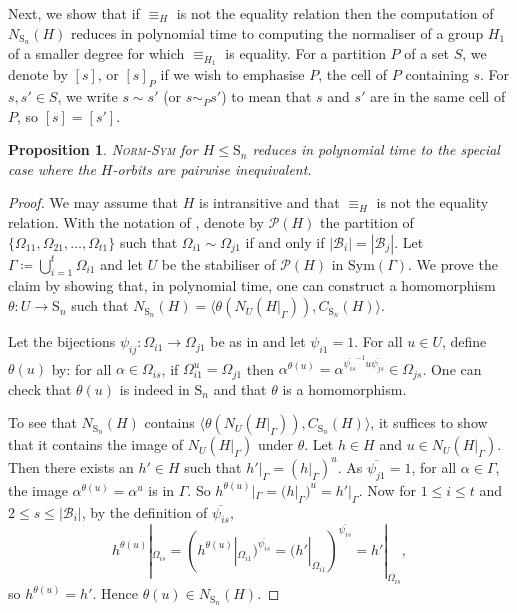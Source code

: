 \documentclass[11pt,a4paper]{article}
\newtheorem{proposition}[theorem]{Proposition}
\theoremstyle{definition}
\theoremstyle{remark}
\newcommand{\Sym}[0]{\mathrm{Sym}}
\newcommand{\Sy}{\mathrm{S}}
\begin{document}
Next, we show that if $\equiv_H$ is not the equality relation then the computation of $N_{\Sy_n}(H)$ reduces in polynomial time to computing the normaliser of a group $H_1$ of a smaller degree for which $\equiv_{H_1}$ is equality.
For a partition $P$ of a set $S$, we denote by $[s]$, or $[s]_P$ if we wish to emphasise $P$, the cell of $P$ containing $s$. 
For $s,s' \in S$, we write $s \sim s'$ (or $s \sim_P s'$) to mean that $s$ and $s'$ are in the same cell of $P$, so $[s] = [s']$. 

\begin{proposition} \label{can remove equiv orbs}
\textsc{Norm-Sym} for $H \leq \Sy_n$ reduces in polynomial time to the special case where the $H$-orbits are pairwise inequivalent. 
\end{proposition}

\begin{proof}
We may assume that $H$ is intransitive and that $\equiv_H$ is not the equality relation. 
With the notation of , 
denote by $\mathcal{P}(H)$ the partition of $\{ \Omega_{11}, \Omega_{21}, \ldots, \Omega_{t1} \}$ such that $\Omega_{i1} \sim \Omega_{j1}$ if and only if $|\mathcal{B}_i| = |\mathcal{B}_j|$.
Let $\Gamma  \coloneqq  \bigcup_{i=1}^{t} \Omega_{i1}$ and let $U$ be the stabiliser of $\mathcal{P}(H)$ in $\Sym(\Gamma)$. 
We prove the claim by showing that, in polynomial time, one can construct a homomorphism $\theta: U \rightarrow \Sy_n$ such that $N_{\Sy_n}(H) = \langle \theta(N_U(H|_{\Gamma})),  C_{\Sy_n}(H) \rangle$. 

Let the bijections $\psi_{ij}: \Omega_{i1} \rightarrow \Omega_{j1}$ be as in   and let $\psi_{i1} = 1$. 
For all $u \in U$, define $\theta(u)$ by: for all $\alpha \in \Omega_{is}$, if $ \Omega_{i1}^{u} = \Omega_{j1}$ then $\alpha^{\theta(u)} = \alpha^{\overline{\psi_{is}}^{-1} u \overline{\psi_{js}}} \in \Omega_{js}$. 
One can check that $\theta(u)$ is indeed in $\Sy_n$ and that $\theta$ is a homomorphism.  

To see that $N_{\Sy_n}(H)$ contains $\langle \theta(N_U(H|_{\Gamma})),  C_{\Sy_n}(H) \rangle$, it suffices to show that it contains the image of $N_U(H|_{\Gamma})$ under $\theta$. Let $h \in H$ and $u \in N_U(H|_{\Gamma})$.
Then there exists an $h' \in H$ such that $h'|_{\Gamma} = (h|_{\Gamma})^{u}$. 
As $\overline{\psi_{j1}}=1$, for all $\alpha \in \Gamma$, the image $\alpha^{\theta(u)} = \alpha^{u}$ is in $\Gamma$. 
So $h^{\theta(u)}|_{\Gamma} = (h|_{\Gamma})^{u} =h'|_{\Gamma}$.  
Now for $1 \leq i \leq t$ and $2 \leq s \leq |\mathcal{B}_i|$, by the definition of $\overline{\psi_{is}}$,
\[h^{\theta(u)}|_{\Omega_{is}} = (h^{\theta(u)}|_{\Omega_{i1}})^{\overline{\psi_{is}}}
= (h'|_{\Omega_{i1}})^{\overline{\psi_{is}}} = h'|_{\Omega_{is}},
\]
so $h^{\theta(u)} = h'$. Hence $\theta(u) \in N_{\Sy_n}(H)$. 


\end{proof}
\end{document}
